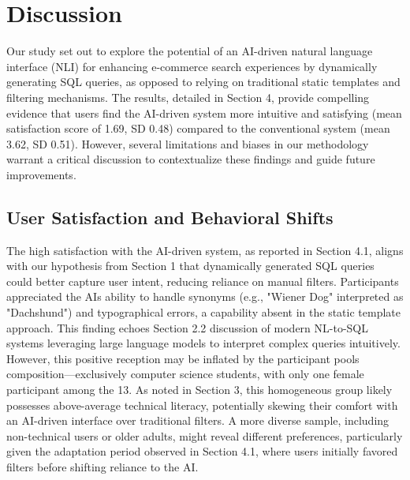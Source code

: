 \documentclass[../../submission.tex]{subfiles}
\begin{document}
\section{Discussion}
Our study set out to explore the potential of an AI-driven natural language interface (NLI) 
for enhancing e-commerce search experiences by dynamically generating SQL queries, as opposed 
to relying on traditional static templates and filtering mechanisms. The results, detailed in 
Section 4, provide compelling evidence that users find the AI-driven system more intuitive and 
satisfying (mean satisfaction score of 1.69, SD 0.48) compared to the conventional system (mean 3.62, SD 0.51). 
However, several limitations and biases in our methodology warrant a critical discussion to contextualize these 
findings and guide future improvements.

\subsection{User Satisfaction and Behavioral Shifts}
The high satisfaction with the AI-driven system, as reported in Section 4.1, aligns 
with our hypothesis from Section 1 that dynamically generated SQL queries could better 
capture user intent, reducing reliance on manual filters. Participants appreciated the AIs ability 
to handle synonyms (e.g., "Wiener Dog" interpreted as "Dachshund") and typographical errors, a capability 
absent in the static template approach. This finding echoes Section 2.2 discussion of modern NL-to-SQL systems 
leveraging large language models to interpret complex queries intuitively. However, this positive reception may be inflated by 
the participant pools composition—exclusively computer science students, with only one female participant 
among the 13. As noted in Section 3, this homogeneous group likely possesses above-average technical literacy, 
potentially skewing their comfort with an AI-driven interface over traditional filters. A more diverse sample, 
including non-technical users or older adults, might reveal different preferences, 
particularly given the adaptation period observed in Section 4.1, where users initially favored filters before shifting reliance to the AI.
\end{document}
